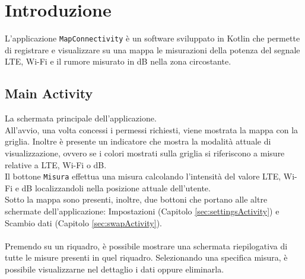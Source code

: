 \documentclass[11pt]{article}
\begin{document}
\section{Introduzione}
L'applicazione \texttt{MapConnectivity} è un software sviluppato in Kotlin che permette di registrare e visualizzare su una mappa le misurazioni della potenza del segnale LTE, Wi-Fi e il rumore misurato in dB nella zona circostante.
\subsection{Main Activity}
\begin{minipage}[t]{0.55\textwidth}
La schermata principale dell'applicazione. \\
All'avvio, una volta concessi i permessi richiesti, viene mostrata la mappa con la griglia. Inoltre è presente un indicatore che mostra la modalità attuale di visualizzazione, ovvero se i colori mostrati sulla griglia si riferiscono a misure relative a LTE, Wi-Fi o dB. \\
Il bottone \texttt{Misura} effettua una misura calcolando l'intensità del valore LTE, Wi-Fi e dB localizzandoli nella posizione attuale dell'utente. \\
Sotto la mappa sono presenti, inoltre, due bottoni che portano alle altre schermate dell'applicazione: Impostazioni (Capitolo \ref{sec:settingsActivity}) e Scambio dati (Capitolo \ref{sec:swapActivity}). \\ \\
Premendo su un riquadro, è possibile mostrare una schermata riepilogativa di tutte le misure presenti in quel riquadro. Selezionando una specifica misura, è possibile visualizzarne nel dettaglio i dati oppure eliminarla.
\end{minipage} \hfill
\end{document}
